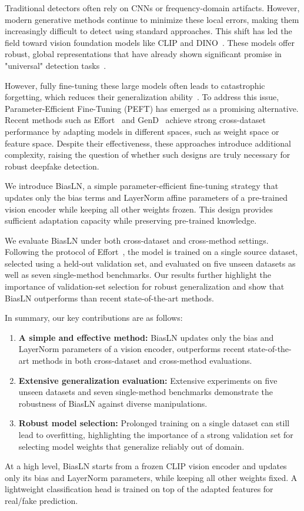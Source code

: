 \documentclass[fonts]{icst}
\begin{document}
Traditional detectors often rely on CNNs or frequency-domain artifacts. However, modern generative methods continue to minimize these local errors, making them increasingly difficult to detect using standard approaches.
This shift has led the field toward vision foundation models like CLIP and DINO~\cite{radford2021clip_vitl,caron2021emerging}.
These models offer robust, global representations that have already shown significant promise in "universal" detection tasks~\cite{ojha2023universal}.

However, fully fine-tuning these large models often leads to catastrophic forgetting, which reduces their generalization ability~\cite{kumar2022finetuning}.
To address this issue, Parameter-Efficient Fine-Tuning (PEFT) has emerged as a promising alternative. Recent methods such as Effort~\cite{yan2025effort} and GenD~\cite{yermakov2025gend} achieve strong cross-dataset performance by adapting models in different spaces, such as weight space or feature space.
Despite their effectiveness, these approaches introduce additional complexity, raising the question of whether such designs are truly necessary for robust deepfake detection.

We introduce BiasLN, a simple parameter-efficient fine-tuning strategy that updates only the bias terms and LayerNorm affine parameters of a pre-trained vision encoder while keeping all other weights frozen. This design provides sufficient adaptation capacity while preserving pre-trained knowledge.

We evaluate BiasLN under both cross-dataset and cross-method settings. Following the protocol of Effort~\cite{yan2025effort}, the model is trained on a single source dataset, selected using a held-out validation set, and evaluated on five unseen datasets as well as seven single-method benchmarks. Our results further highlight the importance of validation-set selection for robust generalization and show that BiasLN outperforms than recent state-of-the-art methods.

In summary, our key contributions are as follows:
\begin{enumerate}
    \item \textbf{A simple and effective method:} BiasLN updates only the bias and LayerNorm parameters of a vision encoder,  outperforms recent state-of-the-art methods in both cross-dataset and cross-method evaluations.

    \item \textbf{Extensive generalization evaluation:} Extensive experiments on five unseen datasets and seven single-method benchmarks demonstrate the robustness of BiasLN against diverse manipulations.

    \item \textbf{Robust model selection:} Prolonged training on a single dataset can still lead to overfitting, highlighting the importance of a strong validation set for selecting model weights that generalize reliably out of domain.
\end{enumerate}
At a high level, BiasLN starts from a frozen CLIP vision encoder and updates only its bias and LayerNorm parameters, while keeping all other weights fixed.
A lightweight classification head is trained on top of the adapted features for real/fake prediction.
\end{document}
